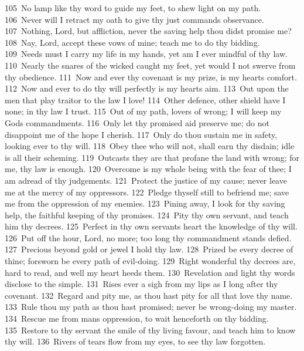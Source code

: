 \documentclass[10pt]{book} %
\begin{document}
\textcolor{benred8}{105}~No lamp like thy word to guide my feet, to shew light on my path. \textcolor{benred8}{106}~Never will I retract my oath to give thy just commands observance. \textcolor{benred8}{107}~Nothing, Lord, but affliction, never the saving help thou didst promise me? \textcolor{benred8}{108}~Nay, Lord, accept these vows of mine; teach me to do thy bidding. \textcolor{benred8}{109}~Needs must I carry my life in my hands, yet am I ever mindful of thy law. \textcolor{benred8}{110}~Nearly the snares of the wicked caught my feet, yet would I not swerve from thy obedience. \textcolor{benred8}{111}~Now and ever thy covenant is my prize, is my heart\textquotesingle s comfort. \textcolor{benred8}{112}~Now and ever to do thy will perfectly is my heart\textquotesingle s aim.
\textcolor{benred8}{113}~Out upon the men that play traitor to the law I love! \textcolor{benred8}{114}~Other defence, other shield have I none; in thy law I trust. \textcolor{benred8}{115}~Out of my path, lovers of wrong; I will keep my God\textquotesingle s commandments. \textcolor{benred8}{116}~Only let thy promised aid preserve me; do not disappoint me of the hope I cherish. \textcolor{benred8}{117}~Only do thou sustain me in safety, looking ever to thy will. \textcolor{benred8}{118}~Obey thee who will not, shall earn thy disdain; idle is all their scheming. \textcolor{benred8}{119}~Outcasts they are that profane the land with wrong; for me, thy law is enough. \textcolor{benred8}{120}~Overcome is my whole being with the fear of thee; I am adread of thy judgements.
\textcolor{benred8}{121}~Protect the justice of my cause; never leave me at the mercy of my oppressors. \textcolor{benred8}{122}~Pledge thyself still to befriend me; save me from the oppression of my enemies. \textcolor{benred8}{123}~Pining away, I look for thy saving help, the faithful keeping of thy promises. \textcolor{benred8}{124}~Pity thy own servant, and teach him thy decrees. \textcolor{benred8}{125}~Perfect in thy own servant\textquotesingle s heart the knowledge of thy will. \textcolor{benred8}{126}~Put off the hour, Lord, no more; too long thy commandment stands defied. \textcolor{benred8}{127}~Precious beyond gold or jewel I hold thy law. \textcolor{benred8}{128}~Prized be every decree of thine; forsworn be every path of evil-doing.
\textcolor{benred8}{129}~Right wonderful thy decrees are, hard to read, and well my heart heeds them. \textcolor{benred8}{130}~Revelation and light thy words disclose to the simple. \textcolor{benred8}{131}~Rises ever a sigh from my lips as I long after thy covenant. \textcolor{benred8}{132}~Regard and pity me, as thou hast pity for all that love thy name. \textcolor{benred8}{133}~Rule thou my path as thou hast promised; never be wrong-doing my master. \textcolor{benred8}{134}~Rescue me from man\textquotesingle s oppression, to wait henceforth on thy bidding. \textcolor{benred8}{135}~Restore to thy servant the smile of thy living favour, and teach him to know thy will. \textcolor{benred8}{136}~Rivers of tears flow from my eyes, to see thy law forgotten.
\end{document}
